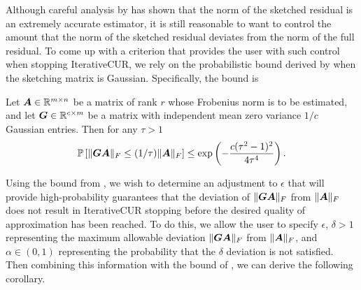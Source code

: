  Although careful analysis by \cite{pearce2025adaptive} has shown that the norm of the sketched residual is an extremely accurate estimator, it is still reasonable to want to control the amount that the norm of the sketched residual deviates from the norm of the full residual. To come up with a criterion that provides the user with such control when stopping IterativeCUR, we rely on the probabilistic bound derived by \cite{gratton2018improved} when the sketching matrix is Gaussian. Specifically, the bound is 
\begin{theorem} \label{thm:gratton-bounds}
    Let $\boldsymbol{A} \in \mathbb{R}^{m \times n}$ be a matrix of rank $r$ whose Frobenius norm is to be estimated, and let $\boldsymbol{G} \in \mathbb{R}^{c \times m}$ be a matrix with independent mean zero variance $1 / c$ Gaussian entries. Then for any $\tau > 1$
    \begin{equation}
        \mathbb{P}\left[ \|\boldsymbol{G} \boldsymbol{A}\|_F \leq (1/\tau) \|\boldsymbol{A}\|_F\right] \leq \exp\left( -\frac{c(\tau ^2- 1)^2}{4 \tau^4}\right).
    \end{equation}
\end{theorem}

Using the bound from \cite{gratton2018improved}, we wish to determine an adjustment to $\epsilon$ that will provide high-probability guarantees that the deviation of $\|\boldsymbol{G}\boldsymbol{A}\|_F$ from $\|\boldsymbol{A}\|_F$ does not result in IterativeCUR stopping before the desired quality of approximation has been reached. To do this, we allow the user to specify $\epsilon$, $\delta >1$ representing the maximum allowable deviation $\|\boldsymbol{G} \boldsymbol{A}\|_F$ from $\|\boldsymbol{A}\|_F$, and $\alpha \in (0,1)$ representing the probability that the $\delta$ deviation is not satisfied. Then combining this information with the bound of \cite{gratton2018improved}, we can derive the following corollary.

